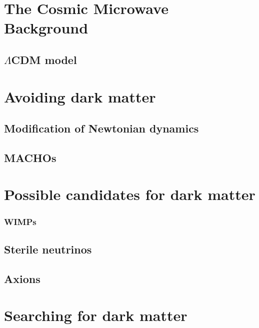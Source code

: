 \section{The Cosmic Microwave Background}\label{sec:DMOverview/CMB}

\subsection{$\Lambda$CDM model}\label{sec:DMOverview/LambdaCDM}

\section{Avoiding dark matter}\label{sec:DMOverview/AvoidDM}

\subsection{Modification of Newtonian dynamics}\label{sec:DMOverview/MOND}

\subsection{MACHOs}\label{sec:DMOverview/MACHOs}

\section{Possible candidates for dark matter}\label{sec:DMOverview/Candidates4DM}

\subsubsection{WIMPs}\label{sec:DMOverview/WIMPs}

\subsection{Sterile neutrinos}\label{sec:DMOverview/Neutrinos}

\subsection{Axions}\label{sec:DMOverview/Axions}

\section{Searching for dark matter}\label{sec:DMOverview/DetectionOfDM}

